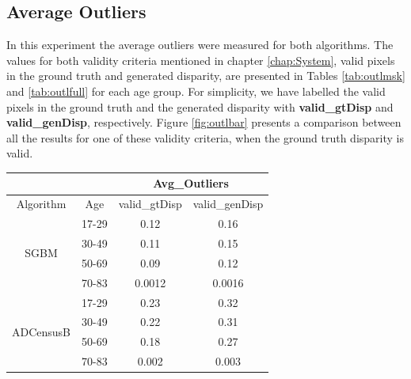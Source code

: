 \subsection{Average Outliers}
In this experiment the average outliers were measured for both algorithms. 
The values for both validity criteria mentioned in chapter \ref{chap:System}, valid pixels in the ground truth and generated disparity, 
are presented in Tables \ref{tab:outlmsk} and \ref{tab:outlfull} for each age group. For simplicity, we have labelled the valid pixels
in the ground truth and the generated disparity with \textbf{valid\_gtDisp} and \textbf{valid\_genDisp}, respectively.
Figure \ref{fig:outlbar} presents a comparison between all the results for one of these validity criteria, when the ground truth disparity is valid. \newline

\begin{minipage}{\linewidth}
\begin{center}
\label{tab:outlmsk}
\begin{tabular}{ |c|c|c|c| }
\hline
\multicolumn{2}{|c}{} & \multicolumn{2}{|c|}{Avg\_Outliers} \\
\hline
Algorithm & Age & valid\_gtDisp & valid\_genDisp \\ \hline
\multirow{4}{*}{SGBM} & 17-29 & 0.12 & 0.16 \\
& 30-49 & 0.11 & 0.15 \\
& 50-69 & 0.09 & 0.12 \\
& 70-83 & 0.0012 & 0.0016 \\ \hline
\multirow{4}{*}{ADCensusB} & 17-29 & 0.23 & 0.32 \\
& 30-49 & 0.22 & 0.31 \\
& 50-69 & 0.18 & 0.27 \\
& 70-83 & 0.002 & 0.003 \\ \hline
\end{tabular}
\end{center}
\end{minipage} \newline \newline


